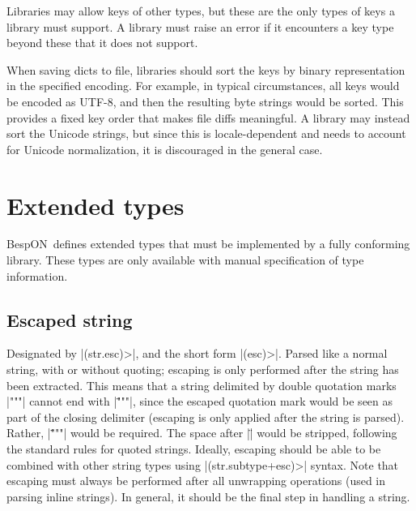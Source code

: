 \documentclass[11pt]{article}
\newcommand{\bespon}{BespON}
\begin{document}
Libraries may allow keys of other types, but these are the only types of keys a library must support.  A library must raise an error if it encounters a key type beyond these that it does not support.

When saving dicts to file, libraries should sort the keys by binary representation in the specified encoding.  For example, in typical circumstances, all keys would be encoded as UTF-8, and then the resulting byte strings would be sorted.  This provides a fixed key order that makes file diffs meaningful.  A library may instead sort the Unicode strings, but since this is locale-dependent and needs to account for Unicode normalization, it is discouraged in the general case.



\section{Extended types}

\bespon\ defines extended types that must be implemented by a fully conforming library.  These types are only available with manual specification of type information.


\subsection{Escaped string}

Designated by |(str.esc)>|, and the short form |(esc)>|.  Parsed like a normal string, with or without quoting; escaping is only performed after the string has been extracted.  This means that a string delimited by double quotation marks |"""| cannot end with |\""""|, since the escaped quotation mark would be seen as part of the closing delimiter (escaping is only applied after the string is parsed).  Rather, |\" """| would be required.  The space after |\"| would be stripped, following the standard rules for quoted strings.  Ideally, escaping should be able to be combined with other string types using |(str.subtype+esc)>| syntax.  Note that escaping must always be performed after all unwrapping operations (used in parsing inline strings).  In general, it should be the final step in handling a string.
\end{document}
